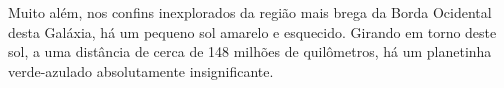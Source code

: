 \documentclass{minimal}
\begin{document}
  Muito       além, nos confins     inexplorados da região mais     brega da Borda Ocidental desta Galáxia, há um pequeno sol amarelo e esquecido.
  Girando em torno deste sol, a uma distância de cerca de 148 milhões de quilômetros, há um planetinha verde-azulado absolutamente insignificante.
\end{document}
